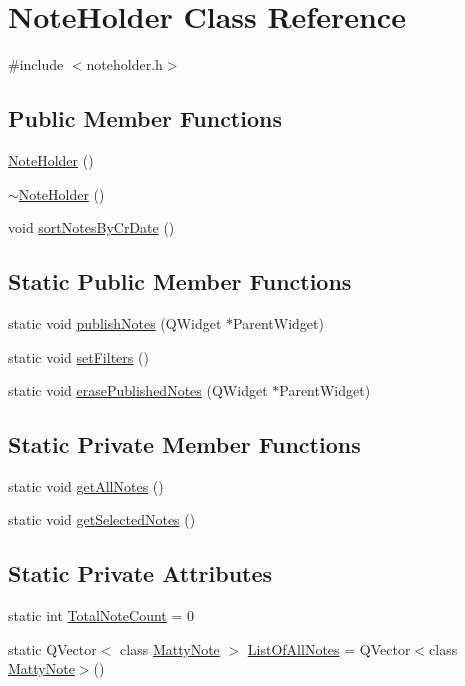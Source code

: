 \hypertarget{classNoteHolder}{}\section{Note\+Holder Class Reference}
\label{classNoteHolder}


{\ttfamily \#include $<$noteholder.\+h$>$}

\subsection*{Public Member Functions}
\begin{DoxyCompactItemize}
\item 
\hyperlink{classNoteHolder_a8a6d0e272ccfe8f56534c646b8c5e92c}{Note\+Holder} ()
\item 
\hyperlink{classNoteHolder_afaeb3c127fbbc30d03b69e2cb0f15f2a}{$\sim$\+Note\+Holder} ()
\item 
void \hyperlink{classNoteHolder_a542006185a3eaf3e9b13fc0bfb01b2e7}{sort\+Notes\+By\+Cr\+Date} ()
\end{DoxyCompactItemize}
\subsection*{Static Public Member Functions}
\begin{DoxyCompactItemize}
\item 
static void \hyperlink{classNoteHolder_abb4a2d19ddace4d652cfda5becd03302}{publish\+Notes} (Q\+Widget $\ast$Parent\+Widget)
\item 
static void \hyperlink{classNoteHolder_a848b098c6649554c7dcc0605c90e8a24}{set\+Filters} ()
\item 
static void \hyperlink{classNoteHolder_a4559ef4141f902ae5712052084c6187e}{erase\+Published\+Notes} (Q\+Widget $\ast$Parent\+Widget)
\end{DoxyCompactItemize}
\subsection*{Static Private Member Functions}
\begin{DoxyCompactItemize}
\item 
static void \hyperlink{classNoteHolder_a53853f7b183e262eb165bdb3af8f3e45}{get\+All\+Notes} ()
\item 
static void \hyperlink{classNoteHolder_ab4709f2b857351ba118201a159c5cd6c}{get\+Selected\+Notes} ()
\end{DoxyCompactItemize}
\subsection*{Static Private Attributes}
\begin{DoxyCompactItemize}
\item 
static int \hyperlink{classNoteHolder_aeb685924427caabb7087ef7cf743c913}{Total\+Note\+Count} = 0
\item 
static Q\+Vector$<$ class \hyperlink{classMattyNote}{Matty\+Note} $>$ \hyperlink{classNoteHolder_aba93502b4bdb3358063a0433fe4def4f}{List\+Of\+All\+Notes} = Q\+Vector$<$class \hyperlink{classMattyNote}{Matty\+Note}$>$()
\end{DoxyCompactItemize}


